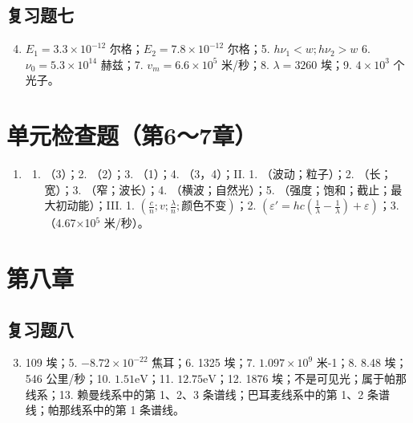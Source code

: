 \subsection{复习题七}

\begin{enumerate}
\setcounter{enumi}{3}
\item
  \(E_{1} = 3.3 \times 10^{-12}\) 尔格；\(E_{2}=7.8\times10^{-12}\)
  尔格；5. \(h\nu_{1} < w; h\nu_{2} > w\) 6.
  \(\nu_{0} = 5.3 \times 10^{14}\) 赫兹；7. \(v_{m}=6.6\times10^{5}\)
  米/秒；8. \(\lambda = 3260\) 埃；9. \(4 \times 10^{3}\) 个光子。
\end{enumerate}

\section{单元检查题（第6～7章）}

\begin{enumerate}
\item
  \begin{enumerate}
  \item
    （3）；2. （2）；3. （1）；4. （3，4）；II. 1. （波动；粒子）；2.
    （长；宽）；3. （窄；波长）；4. （横波；自然光）；5.
    （强度；饱和；截止；最大初动能）；III. 1.
    \(\left(\frac{c}{n}; v; \frac{\lambda}{n}; \text{颜色不变}\right)\)；2.
    \(\left(\varepsilon' = hc\left(\frac{1}{\lambda} - \frac{1}{\lambda}\right) + \varepsilon\right)\)；3.
    （4.67×10\(^{5}\) 米/秒）。
  \end{enumerate}
\end{enumerate}

\section{第八章}

\subsection{复习题八}

\begin{enumerate}
\setcounter{enumi}{2}
\item
  109 埃；5. \(-8.72 \times 10^{-22}\) 焦耳；6. 1325 埃；7.
  \(1.097 \times 10^{9}\) 米-1；8. 8.48 埃；546 公里/秒；10.
  \(1.51 \mathrm{eV}\)；11. \(12.75 \mathrm{eV}\)；12. 1876
  埃；不是可见光；属于帕那线系；13. 赖曼线系中的第 1、2、3
  条谱线；巴耳麦线系中的第 1、2 条谱线；帕那线系中的第 1 条谱线。
\end{enumerate}

